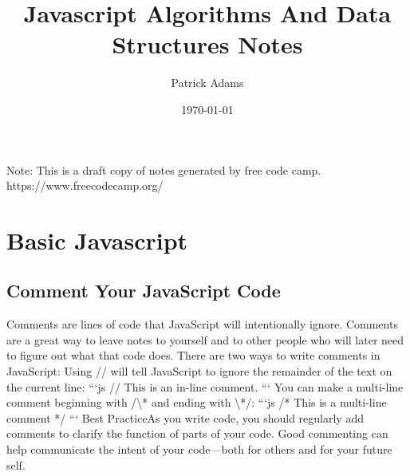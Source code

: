 \documentclass{article}%
\title{Javascript Algorithms And Data Structures Notes}%
\author{Patrick Adams}%
\date{\today}%
\begin{document}
%
\normalsize%
\maketitle%
\newpage%
Note: This is a draft copy of notes generated by free code camp.\newline%
%
https://www.freecodecamp.org/%
\newpage%
\tableofcontents%
\section{Basic Javascript}%
\label{sec:BasicJavascript}%
\subsection{Comment Your JavaScript Code}%
\label{subsec:CommentYourJavaScriptCode}%
Comments are lines of code that JavaScript will intentionally ignore. Comments are a great way to leave notes to yourself and to other people who will later need to figure out what that code does.\newline%
There are two ways to write comments in JavaScript:\newline%
Using // will tell JavaScript to ignore the remainder of the text on the current line:\newline%
```js\newline%
// This is an in{-}line comment.\newline%
```\newline%
You can make a multi{-}line comment beginning with /\textbackslash{}* and ending with \textbackslash{}*/:\newline%
```js\newline%
/* This is a\newline%
multi{-}line comment */\newline%
```\newline%
Best PracticeAs you write code, you should regularly add comments to clarify the function of parts of your code. Good commenting can help communicate the intent of your code—both for others and for your future self.\newline%

%
\end{document}
